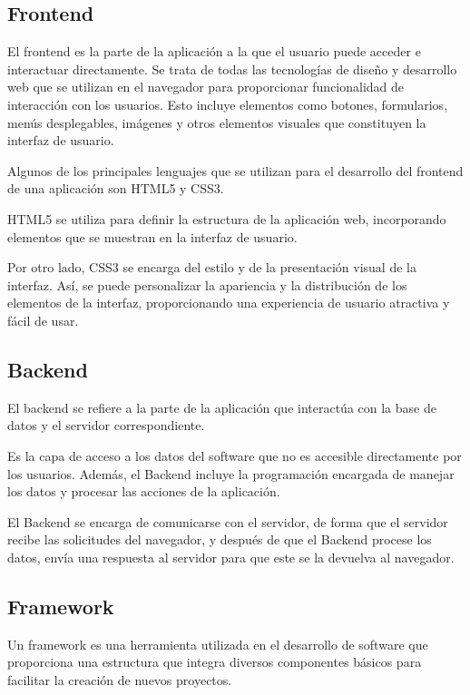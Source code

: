 \subsection{Frontend}
\cite{frontendybackend} El frontend es la parte de la aplicación a la que el usuario puede acceder e interactuar directamente. Se trata de todas las tecnologías de diseño y desarrollo web que se utilizan en el navegador para proporcionar funcionalidad de interacción con los usuarios. Esto incluye elementos como botones, formularios, menús desplegables, imágenes y otros elementos visuales que constituyen la interfaz de usuario.

Algunos de los principales lenguajes que se utilizan para el desarrollo del frontend de una aplicación son HTML5 y CSS3.

HTML5 se utiliza para definir la estructura de la aplicación web, incorporando elementos que se muestran en la interfaz de usuario. 

Por otro lado, CSS3 se encarga del estilo y de la presentación visual de la interfaz. Así, se puede personalizar la apariencia y la distribución de los elementos de la interfaz, proporcionando una experiencia de usuario atractiva y fácil de usar.

\subsection{Backend}
\cite{frontendybackend} El backend se refiere a la parte de la aplicación que interactúa con la base de datos y el servidor correspondiente. 

Es la capa de acceso a los datos del software que no es accesible directamente por los usuarios. Además, el Backend incluye la programación encargada de manejar los datos y procesar las acciones de la aplicación. 

\cite{backend} El Backend se encarga de comunicarse con el servidor, de forma que el servidor recibe las solicitudes del navegador, y después de que el Backend procese los datos, envía una respuesta al servidor para que este se la devuelva al navegador.

\subsection{Framework}
\cite{framework} Un framework es una herramienta utilizada en el desarrollo de software que proporciona una estructura que integra diversos componentes básicos para facilitar la creación de nuevos proyectos. 

